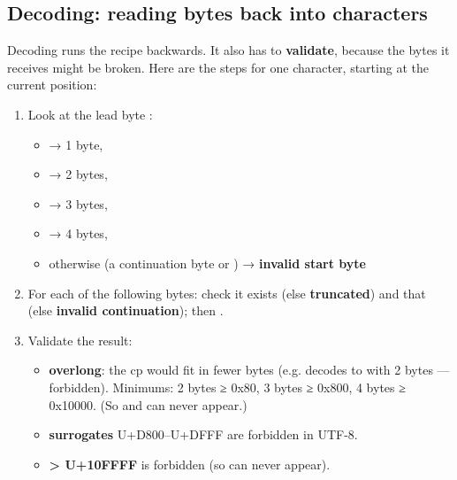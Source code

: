 \documentclass[10pt,a4paper]{article}
\begin{document}
\subsection{Decoding: reading bytes back into characters}
Decoding runs the recipe backwards. It also has to \textbf{validate}, because the bytes it receives might be broken. Here are the steps for one character, starting at the current position:
\begin{enumerate}
\item Look at the lead byte :
\begin{itemize}
\item {} → 1 byte, 
\item {} → 2 bytes, 
\item {} → 3 bytes, 
\item {} → 4 bytes, 
\item otherwise (a continuation byte  or ) → \textbf{invalid start byte}
\end{itemize}
\item For each of the following  bytes: check it exists (else \textbf{truncated}) and that  (else \textbf{invalid continuation}); then .
\item Validate the result:
\begin{itemize}
\item \textbf{overlong}: the cp would fit in fewer bytes (e.g.  decodes to \code{/\allowbreak{}} with 2 bytes — forbidden). Minimums: 2 bytes ≥ 0x80, 3 bytes ≥ 0x800, 4 bytes ≥ 0x10000. (So  and  can never appear.)
\item \textbf{surrogates} U+D800–U+DFFF are forbidden in UTF-8.
\item \textbf{\textgreater{} U+10FFFF} is forbidden (so  can never appear).
\end{itemize}
\end{enumerate}
\end{document}
